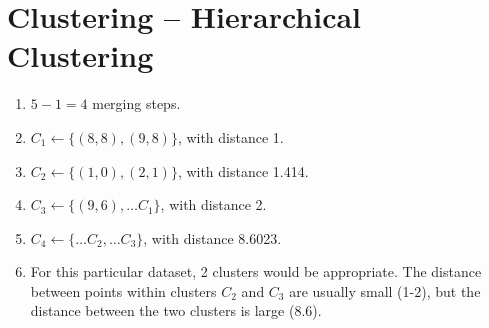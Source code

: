 \newpage
\section{Clustering -- Hierarchical Clustering}

\begin{enumerate}[label=(\alph*)]
	\item $5 - 1 = 4$ merging steps.
	\item $C_1 \leftarrow \{(8, 8), (9, 8)\}$, with distance 1.
	\item $C_2 \leftarrow \{(1, 0), (2, 1)\}$, with distance 1.414.
	\item $C_3 \leftarrow \{(9, 6), \dots C_1\}$, with distance 2.
	\item $C_4 \leftarrow \{\dots C_2, \dots C_3\}$, with distance 8.6023.
	\item For this particular dataset, 2 clusters would be appropriate. The distance between points within clusters $C_2$ and $C_3$ are usually small (1-2), but
	      the distance between the two clusters is large (8.6).
\end{enumerate}


